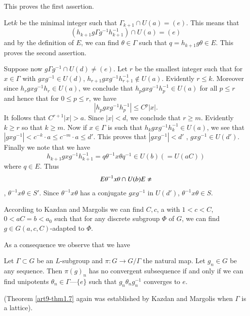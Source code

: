 This proves the first assertion.

Let\pageoriginale $k$ be the minimal integer such that $\Gamma_{k+1} \cap U (a) = (e)$. This means that
$$
(h_{k+1} g \Gamma g^{-1} h^{-1}_{k+1}) \cap U (a) = (e)
$$
and by the definition of $E$, we can find $\theta \in \Gamma$ such that $q = h_{k+1} g \theta \in E$. This proves the second assertion.

Suppose now $g \Gamma g^{-1} \cap U (d) \neq (e)$. Let $r$ be the smallest integer such that for $x \in \Gamma$ with $g x g^{-1} \in U (d)$, $h_{r+1} gx g^{-1} h^{-1}_{r+1} \not\in U (a)$. Evidently $r \leqslant k$. Moreover since $h_r g x g^{-1} h_r \in U (a)$, we conclude  that $h_p g x g^{-1} h^{-1}_p \in U (a)$ for all $p \leqslant r$ and hence that for $0 \leqslant p \leqslant r$, we have
$$
|h_p g x g^{-1} h^{-1}_p| \leqslant C^{p} |x|.
$$
It follows that $C^{r+1} |x|>a$. Since $|x|<d$, we conclude that $r \geqslant m$. Evidently $k \geqslant r$ so that $k \geqslant m$. Now if $x \in \Gamma$ is such that $h_k g x g^{-1} h^{-1}_k \in U (a)$, we see that $|g x g^{-1}| < c^{-k} \cdot a \leqslant c^{-m} \cdot a\leqslant d'$. This proves that $|g xg^{-1}| < d'$ \ie, $gxg^{-1} \in U (d')$. Finally we note that we have
$$
h_{k+1} g x g^{-1} h^{-1}_{k+1} = q \theta^{-1} x \theta q^{-1} \in U (b) (= U (aC))
$$
where $q \in E$. Thus
$$
E \theta^{-1} x \theta \cap U (b) E \neq \empty
$$
\ie, $\theta^{-1} x \theta \in S'$. Since $\theta^{-1} x \theta$ has a conjugate $g x g^{-1}$ in $U(d')$, $\theta^{-1} x \theta \in S$.

\begin{remark}\label{art9-rem1.6} 
According to Kazdan and Margolis \cite{art9-kazdan-margolis-1} we can find $C, c$, a with $1 < c < C$, $0 < a C = b < a_0$ such that for any discrete subgroup $\Phi$ of $G$, we can find $g \in G (a, c, C)$-adapted to $\Phi$.
\end{remark}

As a consequence we observe that we have

\begin{theorem}\label{art9-thm1.7}
Let $\Gamma \subset G$ be an $L$-subgroup and $\pi : G \to G/\Gamma$ the natural map. Let $g_n \in G$ be any sequence. Then $\pi(g)_n$ has no convergent subsequence if and only if we can find unipotents $\theta_n \in \Gamma$---$\{e\}$ such that $g_n \theta_n g^{-1}_n$ converges to $e$.
\end{theorem}

(Theorem \ref{art9-thm1.7} again was established by Kazdan and Margolis when $\Gamma$ is a lattice).


